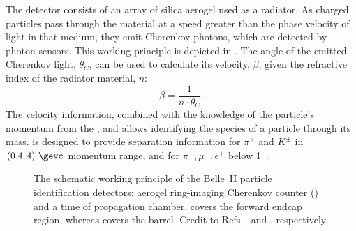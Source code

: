 The \ARICH detector \cite{Yusa:2014tua} consists of an array of silica aerogel used as a radiator.
As charged particles pass through the material at a speed greater than the phase velocity of light in that medium, 
they emit Cherenkov photons, which are detected by photon sensors.
This working principle is depicted in .
The angle of the emitted Cherenkov light, $\theta_C$, can be used to calculate its velocity, $\beta$, 
given the refractive index of the radiator material, $n$:
\begin{equation}
    \beta = \frac{1}{n\cdot\theta_C}.
\end{equation}
The velocity information, combined with the knowledge of the particle's momentum from the \CDC, \SVD and \PXD allows identifying the species of a particle through its mass.
\ARICH is designed to provide separation information for $\pi^{\pm}$ and $K^{\pm}$ in $(0.4,4)~\gevc$ momentum range, and for $\pi^{\pm},\mu^{\pm},e^{\pm}$ below 1~\gevc.

\begin{figure}[htbp!]
    \centering
    \caption{\label{fig:pid}
    The schematic working principle of the Belle~II particle identification detectors: aerogel ring-imaging Cherenkov counter () and a time of propagation chamber.
    \ARICH covers the forward endcap region, whereas \TOP covers the barrel.
    Credit to Refs.~\cite{Yusa:2014tua} and \cite{Fast:2017pff}, respectively.
    }
\end{figure}

